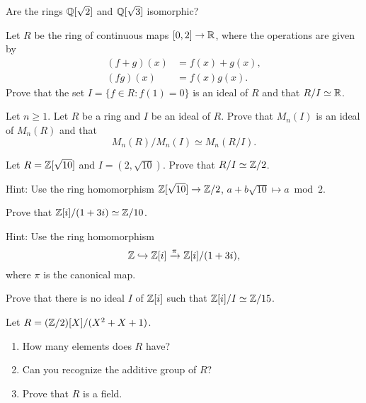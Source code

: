 \begin{exercise}
\label{xca:sqrt2and3}
Are the rings $\mathbb{Q}[\sqrt{2}]$ and $\mathbb{Q}[\sqrt{3}]$ isomorphic?	
\end{exercise}

\begin{exercise}
\label{xca:continuos}
	Let $R$ be the ring of continuous maps $[0,2]\to\mathbb{R}$, where the operations are given by 
	\begin{align*}	    
	(f+g)(x)&=f(x)+g(x),\\
	(fg)(x)&=f(x)g(x).
	\end{align*}
	Prove that the set 
	$I=\{f\in R:f(1)=0\}$ is an ideal of $R$ and that $R/I\simeq\mathbb{R}$.   	
\end{exercise}

\begin{exercise}
\label{xca:matrices}
	Let $n\geq1$. 
	Let $R$ be a ring and $I$ be an ideal of $R$. Prove that $M_n(I)$ is an ideal 
	of $M_n(R)$ and that 
    \[
    M_n(R)/M_n(I)\simeq M_n(R/I).
    \]
\end{exercise}

\begin{exercise}
    \label{xca:Z[sqrt10]/(2,sqrt10)}
    Let $R=\mathbb{Z}[\sqrt{10}]$ and $I=(2,\sqrt{10})$. Prove that $R/I\simeq\mathbb{Z}/2$. 	
\end{exercise}

Hint: Use the ring homomorphism $\mathbb{Z}[\sqrt{10}]\to\mathbb{Z}/2$, $a+b\sqrt{10}\mapsto a\bmod 2$. 	

\begin{exercise}
\label{xca:Z[i]/(1+3i)}
	Prove that $\mathbb{Z}[i]/(1+3i)\simeq\mathbb{Z}/10$. 	
\end{exercise}

Hint: Use 
the ring homomorphism 
\[
\mathbb{Z}\hookrightarrow\mathbb{Z}[i]\xrightarrow{\pi}\mathbb{Z}[i]/(1+3i),
\]
where
$\pi$ is the canonical map. 

\begin{exercise}
\label{xca:Z15}
	Prove that there is no ideal $I$ of $\mathbb{Z}[i]$ 
	such that $\mathbb{Z}[i]/I\simeq\mathbb{Z}/15$. 
\end{exercise}

\begin{exercise}
	Let $R=(\mathbb{Z}/2)[X]/(X^2+X+1)$. 
	\begin{enumerate}
		\item How many elements does $R$ have?
		\item Can you recognize the additive group of $R$?
		\item Prove that $R$ is a field. 	
	\end{enumerate}
\end{exercise}

